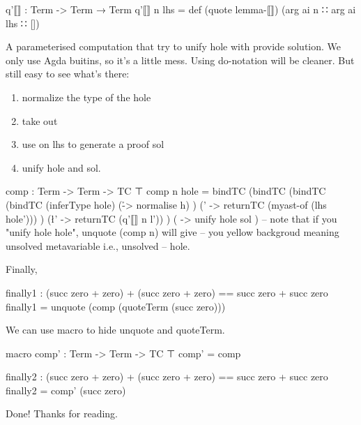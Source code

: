\documentclass{article}
\begin{document}
\begin{code}
q'⟦⟧ : Term -> Term → Term
q'⟦⟧ n lhs = def (quote lemma-⟦⟧) (arg ai n ∷ arg ai lhs ∷ [])
\end{code}

A parameterised  computation that try to unify hole with provide solution. We only use Agda buitins, so it's a little mess. Using do-notation will be cleaner. But still easy to see what's there:

\begin{enumerate}
  \item normalize the type of the hole
  \item take out 
  \item use  on lhs to generate a proof sol
  \item unify hole and sol.
\end{enumerate}

\begin{code}
comp : Term -> Term -> TC ⊤
comp n hole =
  bindTC
    (bindTC
      (bindTC 
        (bindTC
          (inferType hole)
          (\h -> normalise h)
        )
        (\hole' -> returnTC (myast-of (lhs hole')))
      )
      (\l' ->  returnTC (q'⟦⟧ n l'))
    )
    ( \sol -> unify hole sol )
  -- note that if you "unify hole hole", unquote (comp n) will give
  -- you yellow backgroud meaning unsolved metavariable i.e., unsolved
  -- hole.
\end{code}

Finally,

\begin{code}
finally1 : (succ zero + zero) + (succ zero + zero) == succ zero + succ zero
finally1 = unquote (comp (quoteTerm (succ zero)))
\end{code}

We can use macro to hide unquote and quoteTerm.

\begin{code}
macro
  comp' : Term -> Term -> TC ⊤
  comp' = comp

finally2 : (succ zero + zero) + (succ zero + zero) == succ zero + succ zero
finally2 = comp' (succ zero)
\end{code}

Done! Thanks for reading.
\end{document}
